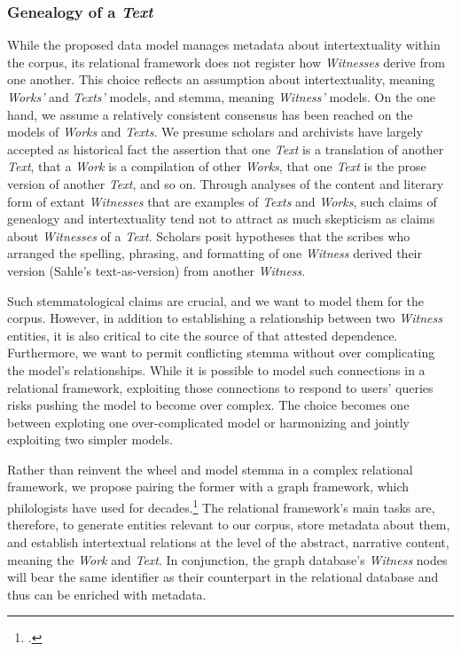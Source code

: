 \subsubsection{Genealogy of a \textit{Text}}

While the proposed data model manages metadata about intertextuality within the corpus, its relational framework does not register how \textit{Witnesses} derive from one another. This choice reflects an assumption about intertextuality, meaning \textit{Works'} and \textit{Texts'} models, and stemma, meaning \textit{Witness'} models. On the one hand, we assume a relatively consistent consensus has been reached on the models of \textit{Works} and \textit{Texts}. We presume scholars and archivists have largely accepted as historical fact the assertion that one \textit{Text} is a translation of another \textit{Text}, that a \textit{Work} is a compilation of other \textit{Works}, that one \textit{Text} is the prose version of another \textit{Text}, and so on. Through analyses of the content and literary form of extant \textit{Witnesses} that are examples of \textit{Texts} and \textit{Works}, such claims of genealogy and intertextuality tend not to attract as much skepticism as claims about \textit{Witnesses} of a \textit{Text}. Scholars posit hypotheses that the scribes who arranged the spelling, phrasing, and formatting of one \textit{Witness} derived their version (Sahle's text-as-version) from another \textit{Witness}.

Such stemmatological claims are crucial, and we want to model them for the corpus. However, in addition to establishing a relationship between two \textit{Witness} entities, it is also critical to cite the source of that attested dependence. Furthermore, we want to permit conflicting stemma without over complicating the model's relationships. While it is possible to model such connections in a relational framework, exploiting those connections to respond to users' queries risks pushing the model to become over complex. The choice becomes one between exploting one over-complicated model or harmonizing and jointly exploiting two simpler models.

Rather than reinvent the wheel and model stemma in a complex relational framework, we propose pairing the former with a graph framework, which philologists have used for decades.\footcite[][]{Zundert2020} The relational framework's main tasks are, therefore, to generate entities relevant to our corpus, store metadata about them, and establish intertextual relations at the level of the abstract, narrative content, meaning the \textit{Work} and \textit{Text}. In conjunction, the graph database's \textit{Witness} nodes will bear the same identifier as their counterpart in the relational database and thus can be enriched with metadata.

